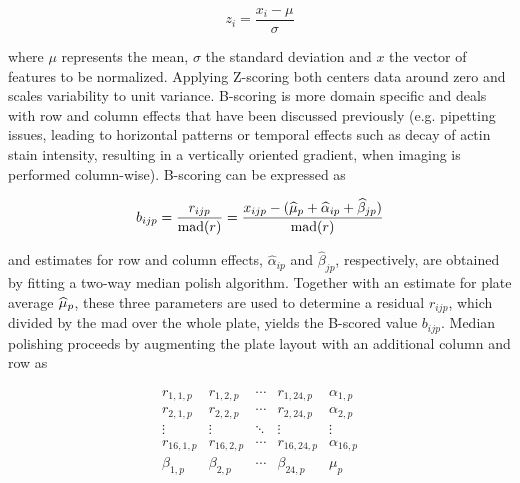 \begin{equation}
  z_i = \frac{x_i - \mu}{\sigma}
\end{equation}

where $\mu$ represents the mean, $\sigma$ the standard deviation and $x$ the vector of features to be normalized. Applying Z-scoring both centers data around zero and scales variability to unit variance. B-scoring is more domain specific and deals with row and column effects that have been discussed previously (e.g. pipetting issues, leading to horizontal patterns or temporal effects such as decay of actin stain intensity, resulting in a vertically oriented gradient, when imaging is performed column-wise). B-scoring can be expressed as

\begin{equation}
  b_{ijp} = \frac{r_{ijp}}{\operatorname{mad}(r)} = \frac{x_{ijp} - (\widehat{\mu}_p + \widehat{\alpha}_{ip} + \widehat{\beta}_{jp})}{\operatorname{mad}(r)}
\end{equation}

and estimates for row and column effects, $\widehat{\alpha}_{ip}$ and $\widehat{\beta}_{jp}$, respectively, are obtained by fitting a two-way median polish algorithm. Together with an estimate for plate average $\widehat{\mu}_p$, these three parameters are used to determine a residual $r_{ijp}$, which divided by the \gls{mad} over the whole plate, yields the B-scored value $b_{ijp}$. Median polishing proceeds by augmenting the plate layout with an additional column and row as

\begin{equation*}
  \begin{array}{cccc|c}
    r_{1,1,p} & r_{1,2,p} & \cdots & r_{1,24,p} & \alpha_{1,p} \\
    r_{2,1,p} & r_{2,2,p} & \cdots & r_{2,24,p} & \alpha_{2,p} \\
    \vdots  & \vdots  & \ddots & \vdots & \vdots \\
    r_{16,1,p} & r_{16,2,p} & \cdots & r_{16,24,p} & \alpha_{16,p} \\
    \hline
    \beta_{1,p} & \beta_{2,p} & \cdots & \beta_{24,p} & \mu_{p} \\
  \end{array}
\end{equation*}

